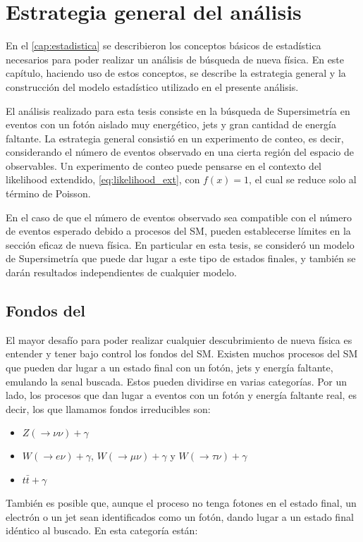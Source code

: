 \chapter{Estrategia general del análisis}
\label{cap:estrategia}

En el \cref{cap:estadistica} se describieron los conceptos básicos de estadística
necesarios para poder realizar un análisis de búsqueda de nueva física. En este
capítulo, haciendo uso de estos conceptos, se describe la estrategia general
y la construcción del modelo estadístico utilizado en el presente análisis.


El análisis realizado para esta tesis consiste en la búsqueda de Supersimetría
en eventos con un fotón aislado muy energético, jets y gran cantidad de energía
faltante. La estrategia general consistió en un experimento de conteo, es decir,
considerando el número de eventos observado en una cierta región del espacio de
observables. Un experimento de conteo puede pensarse en el contexto del
likelihood extendido, \cref{eq:likelihood_ext}, con $f(x) = 1$, el cual se
reduce solo al término de Poisson.

En el caso de que el número de eventos
observado sea compatible con el número de eventos esperado debido a procesos del
SM, pueden establecerse límites en la sección eficaz de nueva física. En
particular en esta tesis, se consideró un modelo de Supersimetría que puede dar
lugar a este tipo de estados finales, y también se darán resultados independientes
de cualquier modelo.


\section{Fondos del {\SM}}

El mayor desafío para poder realizar cualquier descubrimiento de nueva física es
entender y tener bajo control los fondos del SM. Existen muchos procesos del SM
que pueden dar lugar a un estado final con un fotón, jets y energía faltante,
emulando la senal buscada. Estos pueden dividirse en varias categorías. Por un
lado, los procesos que dan lugar a eventos con un fotón y energía faltante real,
es decir, los que llamamos fondos irreducibles son:

\begin{itemize}
\item $Z(\to\nu\nu)+\gamma$
\item $W(\to e\nu)+\gamma$, $W(\to\mu\nu)+\gamma$ y $W(\to \tau\nu)+\gamma$ %
\item $t\bar{t}+\gamma$ %
\end{itemize}
%
También es posible que, aunque el proceso no tenga fotones en el estado final, un
electrón o un jet sean identificados como un fotón, dando lugar a un estado final
idéntico al buscado. En esta categoría están:

